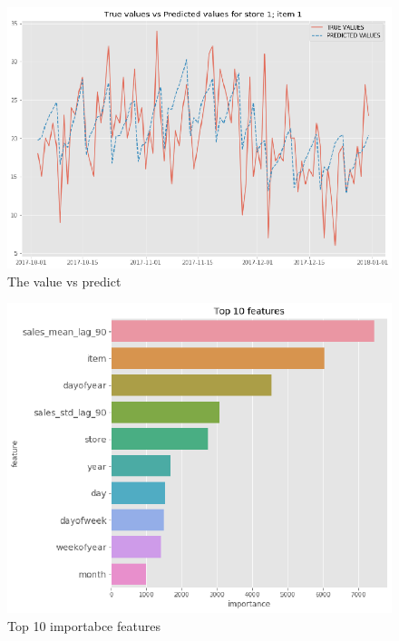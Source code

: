 \begin{figure}[htbp]
	\centering
	
  \includegraphics[scale=0.5]{logos/012.eps}
	\caption{  The value vs predict}\label{fig:008.eps}
\end{figure}

\begin{figure}[htbp]
	\centering
	
  \includegraphics[scale=0.7]{logos/013.eps}
	\caption{Top 10 importabce features }\label{fig:009.eps}
\end{figure}

